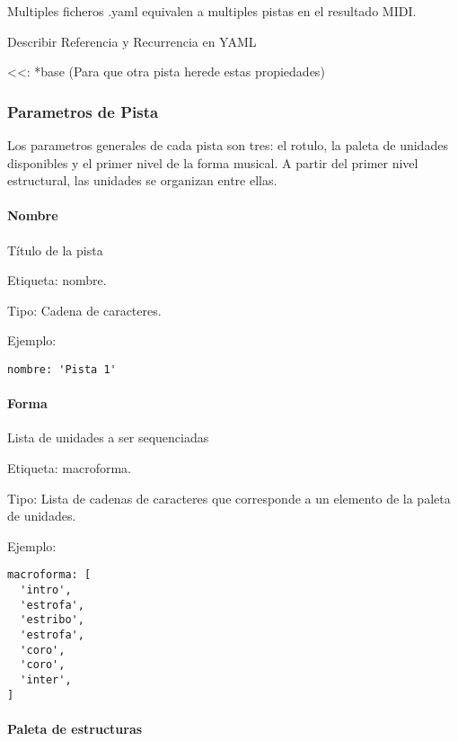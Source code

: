 \documentclass[]{article}
\let\oldparagraph\paragraph
\renewcommand{\paragraph}[1]{\oldparagraph{#1}\mbox{}}
\begin{document}
Multiples ficheros .yaml equivalen a multiples pistas en el resultado
MIDI.

Describir Referencia y Recurrencia en YAML

\textless\textless: *base (Para que otra pista herede estas propiedades)

\hypertarget{parametros-de-pista}{%
\subsubsection{Parametros de Pista}\label{parametros-de-pista}}

Los parametros generales de cada pista son tres: el rotulo, la paleta de
unidades disponibles y el primer nivel de la forma musical. A partir del
primer nivel estructural, las unidades se organizan entre ellas.

\hypertarget{nombre}{%
\paragraph{Nombre}\label{nombre}}

Título de la pista

Etiqueta: nombre.

Tipo: Cadena de caracteres.

Ejemplo:

\begin{Verbatim}
nombre: 'Pista 1'
\end{Verbatim}

\hypertarget{forma}{%
\paragraph{Forma}\label{forma}}

Lista de unidades a ser sequenciadas

Etiqueta: macroforma.

Tipo: Lista de cadenas de caracteres que corresponde a un elemento de la
paleta de unidades.

Ejemplo:

\begin{Verbatim}
macroforma: [
  'intro',
  'estrofa',
  'estribo',
  'estrofa',
  'coro',
  'coro',
  'inter',
]
\end{Verbatim}

\hypertarget{paleta-de-estructuras}{%
\paragraph{Paleta de estructuras}\label{paleta-de-estructuras}}
\end{document}
